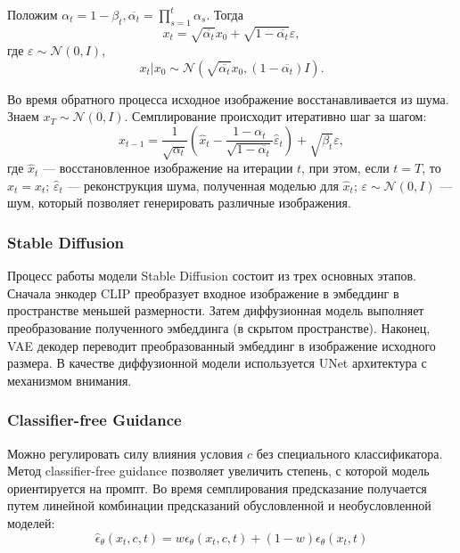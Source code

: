 \documentclass{article}
\begin{document}
Положим $\alpha_t=1-\beta_t, \overline{\alpha_t} = \prod\limits_{s = 1}^t\alpha_s$. Тогда 
\begin{equation}
x_t = \sqrt{\overline{\alpha_t}}x_0+\sqrt{1-\overline{\alpha_t}}\varepsilon,
\end{equation}
где $\varepsilon \sim \mathcal{N}(0, I)$, 
\begin{equation}
x_t|x_0 \sim \mathcal{N}(\sqrt{\overline{\alpha_t}}x_0, (1-\overline{\alpha_t}) I).
\end{equation}

Во время обратного процесса исходное изображение восстанавливается из шума. Знаем $x_T\sim \mathcal{N}(0, I)$. Семплирование происходит итеративно шаг за шагом:
\begin{equation}
\hat{x}_{t-1} = \frac{1}{\sqrt{\alpha_t}}\left( \hat{x}_t - \frac{1-\alpha_t}{\sqrt{1-\overline{\alpha_t}}}\hat{\varepsilon}_t\right) + \sqrt{\beta_t}\varepsilon,
\end{equation}
где $\hat{x}_t$ --- восстановленное изображение на итерации $t$, при этом, если $t = T$, то $\hat{x}_t = x_t$; $\hat{\varepsilon}_t$ --- реконструкция шума, полученная моделью для $\hat{x}_t$; $\varepsilon \sim \mathcal{N}(0, I)$ --- шум, который позволяет генерировать различные изображения. 

\subsubsection{Stable Diffusion}
Процесс работы модели Stable Diffusion состоит из трех основных этапов. Сначала энкодер CLIP преобразует входное изображение в эмбеддинг в пространстве меньшей размерности. Затем диффузионная модель выполняет преобразование полученного эмбеддинга (в скрытом пространстве). Наконец, VAE декодер переводит преобразованный эмбеддинг в изображение исходного размера. В качестве диффузионной модели используется UNet архитектура с механизмом внимания.

\subsubsection{Classifier-free Guidance}
Можно регулировать силу влияния условия $c$ без специального классификатора. Метод classifier-free guidance позволяет увеличить степень, с которой модель ориентируется на промпт. Во время семплирования предсказание получается путем линейной комбинации предсказаний обусловленной и необусловленной моделей: 
\begin{equation}
\hat{\epsilon}_{\theta}(x_t, c, t) = w\epsilon_{\theta}(x_t, c, t) + (1-w)\epsilon_{\theta}(x_t, t)
\end{equation}
\end{document}
